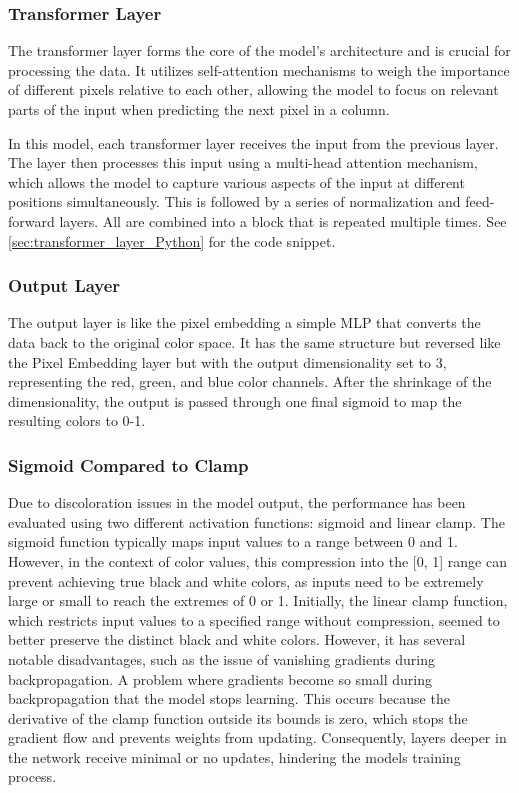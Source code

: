     \subsubsection{Transformer Layer}
    \label{sec:transformer_CIT}

    The transformer layer forms the core of the model's architecture and is crucial for processing the data. It utilizes self-attention mechanisms \autocite{vaswani2023attention} to weigh the importance of different pixels relative to each other, allowing the model to focus on relevant parts of the input when predicting the next pixel in a column. 

    In this model, each transformer layer receives the input from the previous layer. The layer then processes this input using a multi-head attention mechanism, which allows the model to capture various aspects of the input at different positions simultaneously. This is followed by a series of normalization and feed-forward layers. All are combined into a block that is repeated multiple times. See \autoref{sec:transformer_layer_Python} for the code snippet.


    \subsubsection{Output Layer}

    The output layer is like the pixel embedding a simple MLP that converts the data back to the original color space. It has the same structure but reversed like the Pixel Embedding layer but with the output dimensionality set to \(3\), representing the red, green, and blue color channels. After the shrinkage of the dimensionality, the output is passed through one final sigmoid to map the resulting colors to 0-1.

    \subsubsection{Sigmoid Compared to Clamp}
    \label{sec:sigmoid_vs_clamp}
    
    Due to discoloration issues in the model output, the performance has been evaluated using two different activation functions: sigmoid and linear clamp. The sigmoid function typically maps input values to a range between 0 and 1. However, in the context of color values, this compression into the [0, 1] range can prevent achieving true black and white colors, as inputs need to be extremely large or small to reach the extremes of 0 or 1. Initially, the linear clamp function, which restricts input values to a specified range without compression, seemed to better preserve the distinct black and white colors. However, it has several notable disadvantages, such as the issue of vanishing gradients during backpropagation. A problem where gradients become so small during backpropagation that the model stops learning. This occurs because the derivative of the clamp function outside its bounds is zero, which stops the gradient flow and prevents weights from updating. Consequently, layers deeper in the network receive minimal or no updates, hindering the models training process.
    
